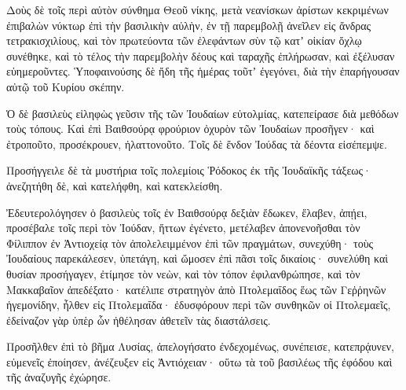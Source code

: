 {Δοὺς δὲ τοῖς περὶ αὐτὸν σύνθημα Θεοῦ νίκης, μετὰ νεανίσκων ἀρίστων κεκριμένων ἐπιβαλὼν νύκτωρ ἐπὶ τὴν βασιλικὴν αὐλὴν, ἐν τῇ παρεμβολῇ ἀνεῖλεν εἰς ἄνδρας τετρακισχιλίους, καὶ τὸν πρωτεύοντα τῶν ἐλεφάντων σὺν τῷ κατʼ οἰκίαν ὄχλῳ συνέθηκε,
καὶ τὸ τέλος τὴν παρεμβολὴν δέους καὶ ταραχῆς ἐπλήρωσαν, καὶ ἐξέλυσαν εὑημεροῦντες.
Ὑποφαινούσης δὲ ἤδη τῆς ἡμέρας τοῦτʼ ἐγεγόνει, διὰ τὴν ἐπαρήγουσαν αὐτῷ τοῦ Κυρίου σκέπην.
\par }{\PP {}Ὁ δὲ βασιλεὺς εἰληφὼς γεῦσιν τῆς τῶν Ἰουδαίων εὐτολμίας, κατεπείρασε διὰ μεθόδων τοὺς τόπους.
Καὶ ἐπὶ Βαιθσούρᾳ φρούριον ὀχυρὸν τῶν Ἰουδαίων προσῆγεν· καὶ ἐτροποῦτο, προσέκρουεν, ἠλαττονοῦτο.
Τοῖς δὲ ἔνδον Ἰούδας τὰ δέοντα εἰσέπεμψε.
\par }{\PP {}Προσήγγειλε δὲ τὰ μυστήρια τοῖς πολεμίοις Ῥόδοκος ἐκ τῆς Ἰουδαϊκῆς τάξεως· ἀνεζητήθη δὲ, καὶ κατελήφθη, καὶ κατεκλείσθη.
\par }{\PP {}Ἐδευτερολόγησεν ὁ βασιλεὺς τοῖς ἐν Βαιθσούρᾳ δεξιὰν ἔδωκεν, ἔλαβεν, ἀπῄει, προσέβαλε τοῖς περὶ τὸν Ἰούδαν, ἥττων ἐγένετο,
μετέλαβεν ἀπονενοῆσθαι τὸν Φίλιππον ἐν Ἀντιοχείᾳ τὸν ἀπολελειμμένον ἐπὶ τῶν πραγμάτων, συνεχύθη· τοὺς Ἰουδαίους παρεκάλεσεν, ὑπετάγη, καὶ ὤμοσεν ἐπὶ πᾶσι τοῖς δικαίοις· συνελύθη καὶ θυσίαν προσήγαγεν, ἐτίμησε τὸν νεὼν, καὶ τὸν τόπον ἐφιλανθρώπησε,
καὶ τὸν Μακκαβαῖον ἀπεδέξατο· κατέλιπε στρατηγὸν ἀπὸ Πτολεμαΐδος ἕως τῶν Γεῤῥηνῶν ἡγεμονίδην,
ἦλθεν εἰς Πτολεμαΐδα· ἐδυσφόρουν περὶ τῶν συνθηκῶν οἱ Πτολεμαεῖς, ἐδείναζον γὰρ ὑπὲρ ὧν ἠθέλησαν ἀθετεῖν τὰς διαστάλσεις.
\par }{\PP {}Προσῆλθεν ἐπὶ τὸ βῆμα Λυσίας, ἀπελογήσατο ἐνδεχομένως, συνέπεισε, κατεπρᾴυνεν, εὐμενεῖς ἐποίησεν, ἀνέζευξεν εἰς Ἀντιόχειαν· οὕτω τὰ τοῦ βασιλέως τῆς ἐφόδου καὶ τῆς ἀναζυγῆς ἐχώρησε.

}
